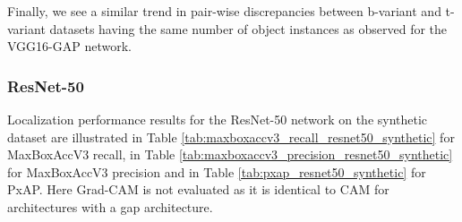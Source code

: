 Finally, we see a similar trend in pair-wise discrepancies between b-variant and t-variant datasets having the same number of object instances as observed for the VGG16-GAP network.  

\subsubsection{ResNet-50}
Localization performance results for the ResNet-50 network on the synthetic dataset are illustrated in Table \ref{tab:maxboxaccv3_recall_resnet50_synthetic} for MaxBoxAccV3 recall, in Table \ref{tab:maxboxaccv3_precision_resnet50_synthetic} for MaxBoxAccV3 precision and in Table \ref{tab:pxap_resnet50_synthetic} for PxAP. Here Grad-CAM is not evaluated as it is identical to CAM for architectures with a \acrshort{gap} architecture.

